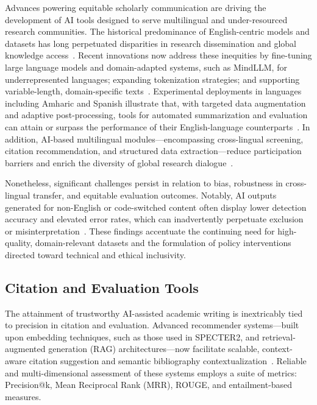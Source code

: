 \documentclass[sigconf]{acmart}
\begin{document}
Advances powering equitable scholarly communication are driving the development of AI tools designed to serve multilingual and under-resourced research communities. The historical predominance of English-centric models and datasets has long perpetuated disparities in research dissemination and global knowledge access~\cite{ref90,ref93,ref97,ref98,ref100,ref104,ref105,ref110}. Recent innovations now address these inequities by fine-tuning large language models and domain-adapted systems, such as MindLLM, for underrepresented languages; expanding tokenization strategies; and supporting variable-length, domain-specific texts~\cite{ref90,ref97,ref100,ref105,ref110}. Experimental deployments in languages including Amharic and Spanish illustrate that, with targeted data augmentation and adaptive post-processing, tools for automated summarization and evaluation can attain or surpass the performance of their English-language counterparts~\cite{ref93,ref97,ref98,ref104,ref110}. In addition, AI-based multilingual modules—encompassing cross-lingual screening, citation recommendation, and structured data extraction—reduce participation barriers and enrich the diversity of global research dialogue~\cite{ref90,ref93,ref98,ref105}.

Nonetheless, significant challenges persist in relation to bias, robustness in cross-lingual transfer, and equitable evaluation outcomes. Notably, AI outputs generated for non-English or code-switched content often display lower detection accuracy and elevated error rates, which can inadvertently perpetuate exclusion or misinterpretation~\cite{ref90,ref93,ref98,ref105,ref110}. These findings accentuate the continuing need for high-quality, domain-relevant datasets and the formulation of policy interventions directed toward technical and ethical inclusivity.

\subsection{Citation and Evaluation Tools}

The attainment of trustworthy AI-assisted academic writing is inextricably tied to precision in citation and evaluation. Advanced recommender systems—built upon embedding techniques, such as those used in SPECTER2, and retrieval-augmented generation (RAG) architectures—now facilitate scalable, context-aware citation suggestion and semantic bibliography contextualization~\cite{ref107}. Reliable and multi-dimensional assessment of these systems employs a suite of metrics: Precision@k, Mean Reciprocal Rank (MRR), ROUGE, and entailment-based measures.
\end{document}
